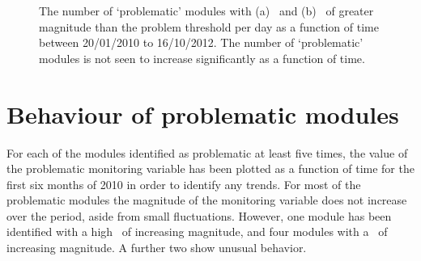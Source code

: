 \begin{figure}
	\centering
  \caption[The number of `problematic' modules with \deltat\ and \tdiff\
  with magnitude greater than the problem threshold per day as a function of time
  between 20/01/2010 to 16/10/2012. ]{The number of `problematic' modules with
  (a) \deltat\ and (b) \tdiff\ of greater magnitude than the problem threshold
  per day as a function of time between 20/01/2010 to 16/10/2012. The number of
  `problematic' modules is not seen to increase significantly as a function of
  time.}
	\label{fig:num_pm}
\end{figure}

\section{Behaviour of problematic modules}

For each of the modules identified as problematic at least five times, the value of the problematic monitoring
variable has been plotted as a function of time for the first six months of 2010
in order to identify any trends. For most of the
problematic modules the magnitude of the monitoring variable does not increase
over the period, aside from small fluctuations.  However, one module has been
identified with a high \deltat\ of increasing magnitude, and four modules with a
\tdiff\ of increasing magnitude. A further two show unusual behavior. 

